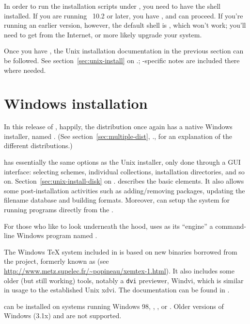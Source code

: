 \documentclass{article}
\begin{document}
In order to run the installation scripts under \MacOSX, you need to have
the  shell installed.  If you are running \MacOSX~10.2
or later, you have , and can proceed.  If you're running
an earlier \MacOSX{} version, however, the default shell is
, which won't work; you'll need to get  from
the Internet, or more likely upgrade your system.

Once you have , the Unix installation documentation in the
previous section can be followed.  See section~\ref{sec:unix-install} on
\p.\pageref{sec:unix-install}; \MacOSX-specific notes are included there
where needed.

\section{Windows installation}
\label{sec:win-install}

In this release of \TL{}, happily, the distribution once
again has a native Windows installer, named .  (See
section~\ref{sec:multiple-dist}, \p.\pageref{sec:multiple-dist}, for an
explanation of the different distributions.)

 has essentially the same options as the Unix
installer, only done through a GUI interface: selecting schemes,
individual collections, installation directories, and so on.
Section~\ref{sec:unix-install-disk} on
\p.\pageref{sec:unix-install-disk} describes the basic elements.  It
also allows some post-installation activities such as adding/removing
packages, updating the filename database and building formats.
Moreover,  can setup the system for running
programs directly from the \DVD.

For those who like to look underneath the hood,  uses
as its ``engine'' a command-line Windows program named .

The Windows \TeX{} system included in \TL{} is based on new binaries 
borrowed from the \XEmTeX{} project, formerly known as \fpTeX{} (see 
\url{http://www.metz.supelec.fr/~popineau/xemtex-1.html}).
It also includes some older (but still working) tools, notably
a \texttt{dvi} previewer, \textsf{Windvi}, which is similar in usage to 
the established Unix \textsf{xdvi}. The documentation can be found in
.

\TL{} can be installed on systems running Windows 98, ,
,  or .  Older versions of Windows (3.1x)
and  are not supported.
\end{document}
